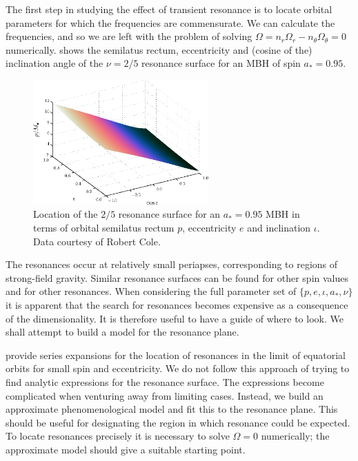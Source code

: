 The first step in studying the effect of transient resonance is to locate orbital parameters for which the frequencies are commensurate. We can calculate the frequencies, and so we are left with the problem of solving $\Omega = n_r \Omega_r - n_\theta \Omega_\theta = 0$ numerically.  shows the semilatus rectum, eccentricity and (cosine of the) inclination angle of the $\nu = 2/5$ resonance surface for an MBH of spin $a_\ast = 0.95$. 
\begin{figure}%
\centering
\includegraphics[width=0.6\textwidth]{./images/Fig_res-2-5-95-plane}
\caption{Location of the $2/5$ resonance surface for an $a_\ast = 0.95$ MBH in terms of orbital semilatus rectum $p$, eccentricity $e$ and inclination $\iota$. Data courtesy of Robert Cole.}\label{fig:res-plane-2-5-95}
\end{figure}
The resonances occur at relatively small periapses, corresponding to regions of strong-field gravity.
Similar resonance surfaces can be found for other spin values and for other resonances. When considering the full parameter set of $\{p,e,\iota,a_\ast,\nu\}$ it is apparent that the search for resonances becomes expensive as a consequence of the dimensionality. It is therefore useful to have a guide of where to look. We shall attempt to build a model for the resonance plane.

\citet{Brink2013} provide series expansions for the location of resonances in the limit of equatorial orbits for small spin and eccentricity. We do not follow this approach of trying to find analytic expressions for the resonance surface. The expressions become complicated when venturing away from limiting cases. Instead, we build an approximate phenomenological model and fit this to the resonance plane. %
This should be useful for designating the region in which resonance could be expected. To locate resonances precisely it is necessary to solve $\Omega = 0$ numerically; the approximate model should give a suitable starting point.

